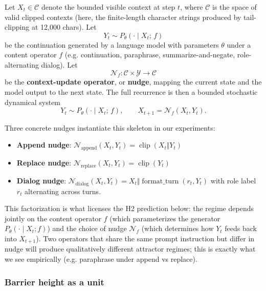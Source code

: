 \documentclass{article}
\theoremstyle{plain}
\theoremstyle{definition}
\begin{document}
Let $X_t \in \mathcal{C}$ denote the bounded visible context at step $t$,
where $\mathcal{C}$ is the space of valid clipped contexts (here, the
finite-length character strings produced by tail-clipping at 12,000
chars). Let
\begin{equation*}
Y_t \sim P_\theta(\cdot \mid X_t;\, f)
\end{equation*}
be the continuation generated by a language model with parameters
$\theta$ under a content operator $f$ (e.g. continuation, paraphrase,
summarize-and-negate, role-alternating dialog). Let
\begin{equation*}
\mathcal{N}_f : \mathcal{C} \times \mathcal{Y} \to \mathcal{C}
\end{equation*}
be the \textbf{context-update operator}, or \textbf{nudge}, mapping the current
state and the model output to the next state. The full recurrence is
then a bounded stochastic dynamical system
\begin{equation*}
Y_t \sim P_\theta(\cdot \mid X_t;\, f),
\qquad
X_{t+1} = \mathcal{N}_f(X_t, Y_t).
\end{equation*}

Three concrete nudges instantiate this skeleton in our experiments:

\begin{itemize}
  \item \textbf{Append nudge}:
  $\mathcal{N}_{\text{append}}(X_t, Y_t) = \operatorname{clip}(X_t \Vert Y_t)$
  \item \textbf{Replace nudge}:
  $\mathcal{N}_{\text{replace}}(X_t, Y_t) = \operatorname{clip}(Y_t)$
  \item \textbf{Dialog nudge}:
  $\mathcal{N}_{\text{dialog}}(X_t, Y_t) = X_t \Vert \operatorname{format\_turn}(r_t, Y_t)$
  with role label $r_t$ alternating across turns.
\end{itemize}

This factorization is what licenses the H2 prediction below: the regime
depends jointly on the content operator $f$ (which parameterizes the
generator $P_\theta(\cdot \mid X_t; f)$) and the choice of nudge
$\mathcal{N}_f$ (which determines how $Y_t$ feeds back into $X_{t+1}$).
Two operators that share the same prompt instruction but differ in nudge
will produce qualitatively different attractor regimes; this is exactly
what we see empirically (e.g. paraphrase under append vs replace).

\subsubsection{Barrier height as a unit}
\end{document}
